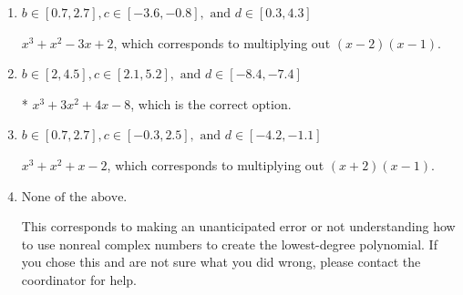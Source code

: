 \documentclass{extbook}[14pt]
\begin{document}
\begin{enumerate}
{\begin{enumerate}[label=\Alph*.]
$x^{3} -3 x^{2} +4 x + 8$, which corresponds to multiplying out $(x-(-2 + 2 i))(x-(-2 - 2 i))(x + 1)$.
\item \( b \in [0.7, 2.7], c \in [-3.6, -0.8], \text{ and } d \in [0.3, 4.3] \)

$x^{3} + x^{2} -3 x + 2$, which corresponds to multiplying out $(x -2)(x -1)$.
\item \( b \in [2, 4.5], c \in [2.1, 5.2], \text{ and } d \in [-8.4, -7.4] \)

* $x^{3} +3 x^{2} +4 x -8$, which is the correct option.
\item \( b \in [0.7, 2.7], c \in [-0.3, 2.5], \text{ and } d \in [-4.2, -1.1] \)

$x^{3} + x^{2} +x -2$, which corresponds to multiplying out $(x + 2)(x -1)$.
\item \( \text{None of the above.} \)

This corresponds to making an unanticipated error or not understanding how to use nonreal complex numbers to create the lowest-degree polynomial. If you chose this and are not sure what you did wrong, please contact the coordinator for help.
\end{enumerate}

}
\end{enumerate}
\end{document}
